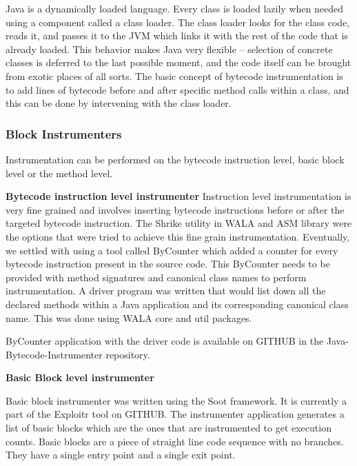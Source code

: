 \documentclass[11pt]{article}
\begin{document}
Java is a dynamically loaded language. Every class is loaded lazily when needed using a component called a class loader. The class loader looks for the class code, reads it, and passes it to the JVM which links it with the rest of the code that is already loaded. This behavior makes Java very flexible – selection of concrete classes is deferred to the last possible moment, and the code itself can be brought from exotic places of all sorts. The basic concept of bytecode instrumentation is to add lines of bytecode before and after specific method calls within a class, and this can be done by intervening with the class loader. 

\subsubsection{Block Instrumenters}

Instrumentation can be performed on the bytecode instruction level, basic block level or the method level.\newline

\textbf{Bytecode instruction level instrumenter}\newline
Instruction level instrumentation is very fine grained and involves inserting bytecode instructions before or after the targeted bytecode instruction. The Shrike utility in WALA and ASM library were the options that were tried to achieve this fine grain instrumentation. Eventually, we settled with using a tool called ByCounter which added a counter for every bytecode instruction present in the source code. This ByCounter needs to be provided with method signatures and canonical class names to perform instrumentation. A driver program was written that would list down all the declared methods within a Java application and its corresponding canonical class name. This was done using WALA core and util packages. \newline

ByCounter application with the driver code is available on GITHUB in the Java-Bytecode-Instrumenter repository. \newline

\textbf{Basic Block level instrumenter}\newline

Basic block instrumenter was written using the Soot framework. It is currently a part of the Exploitr tool on GITHUB. The instrumenter application generates a list of basic blocks which are the ones that are instrumented to get execution counts. Basic blocks are a piece of straight line code sequence with no branches. They have a single entry point and a single exit point.
\end{document}
